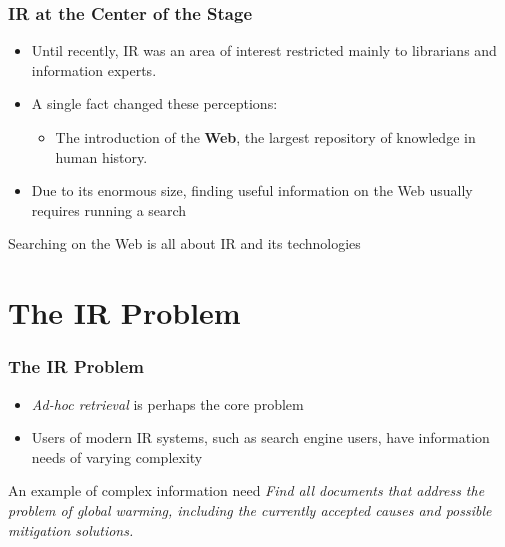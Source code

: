 \documentclass[svgnames]{beamer}
\begin{document}
\begin{frame}
    \frametitle{IR at the Center of the Stage}

    \begin{itemize}
    \item Until recently, IR was an area of interest restricted mainly to
        librarians and information experts. 
    \item A single fact changed these perceptions:
        \begin{itemize}
        \item The introduction of the \textbf{Web}, the largest repository of
            knowledge in human history.
        \end{itemize}
    \item Due to its enormous size, finding useful information on the Web
        usually requires \alert{running a search}
    \end{itemize}

    \begin{block}{}
        \centering Searching on the Web is all about IR and its technologies
    \end{block}

\end{frame}



\section{The IR Problem}


\begin{frame}
    \frametitle{The IR Problem}
    \begin{itemize}
    \item \emph{Ad-hoc retrieval} is perhaps the core problem
    \item Users of modern IR systems, such as search engine users, have
        information needs of varying complexity
    \end{itemize}
    \begin{block}{An example of complex information need}
        {\it Find all documents that address the problem of global warming,
          including the currently accepted causes and possible mitigation
          solutions.}
    \end{block}

\end{frame}
\end{document}
